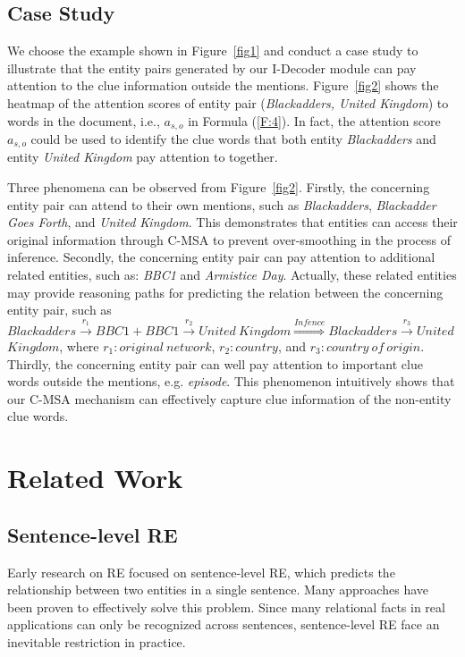 \documentclass[sigconf,natbib=true]{acmart}
\begin{document}
\subsection{Case Study}
We choose the example shown in Figure~\ref{fig1} and conduct a case study to illustrate that the entity pairs generated by our I-Decoder module can pay attention to the clue information outside the mentions.
Figure~\ref{fig2} shows the heatmap of the attention scores of entity pair (\textit{Blackadders, United Kingdom}) to words in the document, i.e., $a_{s,o}$ in Formula (\ref{F:4}). 
In fact, the attention score $a_{s,o}$ could be used to identify the clue words that both entity \textit{Blackadders} and entity \textit{United Kingdom} pay attention to together.

Three phenomena can be observed from Figure~\ref{fig2}. Firstly, the concerning entity pair can attend to their own mentions, such as \textit{Blackadders}, \textit{Blackadder Goes Forth}, and \textit{United Kingdom}.
This demonstrates that entities can access their original information through C-MSA to prevent over-smoothing in the process of inference.
Secondly, the concerning entity pair can pay attention to additional related entities, such as: \textit{BBC1} and \textit{Armistice Day}. Actually, these related entities may provide reasoning paths for predicting the relation between the concerning entity pair, such as $ Blackadders\stackrel{r_1}{\rightarrow}BBC1+BBC1\stackrel{r_2}{\rightarrow}United\ Kingdom \stackrel{Infence}{\Longrightarrow} Blackadders\stackrel{r_3}{\rightarrow}United$ $Kingdom$, where $r_1:original\ network$, $r_2:country$, and $r_3:country\ of\ origin$.
Thirdly, the concerning entity pair can well pay attention to important clue words outside the mentions, e.g. \textit{episode}. This phenomenon intuitively shows that our C-MSA mechanism can effectively capture clue information of the non-entity clue words.



\section{Related Work}
\subsection{Sentence-level RE}
Early research on RE focused on sentence-level RE, which predicts the relationship between two entities in a single sentence.
Many approaches \cite{c:139,c:140,c:142,c:143,c:144,c:145,c:146,c:147,c:148,c:149} have been proven to effectively solve this problem.
Since many relational facts in real applications can only be recognized across sentences, sentence-level RE face an inevitable restriction in practice.
\end{document}
